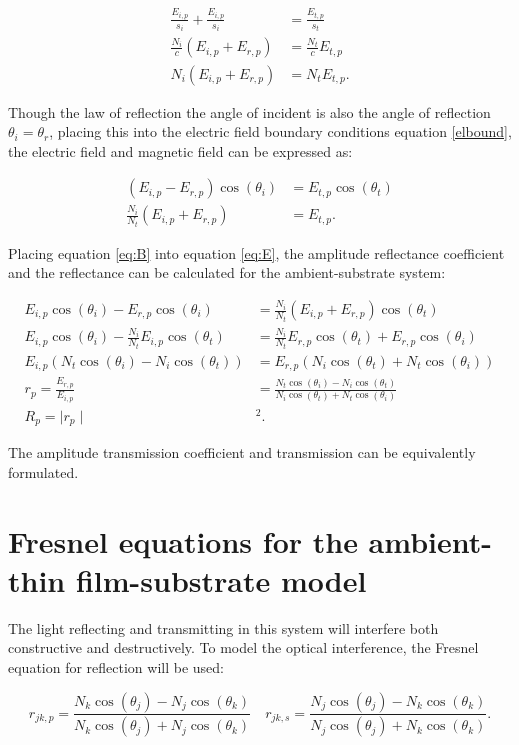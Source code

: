 \documentclass[MasterThesisMain.tex]{subfiles}
\begin{document}
\begin{align}
\frac{E_{i,p}}{s_i} + \frac{E_{i,p}}{s_i} &= \frac{E_{t,p}}{s_t}\\
\frac{N_i}{c}(E_{i,p}+E_{r,p}) &= \frac{N_t}{c}E_{t,p}\\
N_i(E_{i,p}+E_{r,p}) &= N_tE_{t,p}.
\end{align} 

Though the law of reflection the angle of incident is also the angle of reflection $\theta_i=\theta_r$, placing this into the electric field boundary conditions equation \ref{elbound}, the electric field and magnetic field can be expressed as:

\begin{align}
(E_{i,p}-E_{r,p})\cos(\theta_i) &= E_{t,p}\cos(\theta_t) \label{eq:E}\\
\frac{N_i}{N_t}(E_{i,p}+E_{r,p}) &= E_{t,p}. \label{eq:B}
\end{align}

Placing equation \ref{eq:B} into equation \ref{eq:E}, the amplitude reflectance coefficient and the reflectance can be calculated for the ambient-substrate system:

\begin{align}
E_{i,p}\cos(\theta_i)-E_{r,p}\cos(\theta_i) &= \frac{N_i}{N_t}(E_{i,p}+E_{r,p}) \cos(\theta_t) \\
E_{i,p}\cos(\theta_i) - \frac{N_i}{N_t}E_{i,p} \cos(\theta_t) &= \frac{N_i}{N_t}E_{r,p} \cos(\theta_t) + E_{r,p} \cos(\theta_i)\\
E_{i,p}(N_t\cos(\theta_i)-N_i\cos(\theta_t)) &= E_{r,p}(N_i\cos(\theta_t)+N_t\cos(\theta_i))\\
r_p = \frac{E_{r,p}}{E_{i,p}} &= \frac{N_t\cos(\theta_i)-N_i\cos(\theta_t)}{N_i\cos(\theta_t)+N_t\cos(\theta_i)} \label{eq:a-srefl}\\
R_p = \mid r_p \mid &^2.
\end{align}

The amplitude transmission coefficient and transmission can be equivalently formulated. 

\section{Fresnel equations for the ambient-thin film-substrate model}\label{ch:fresnel2lay}
The light reflecting and transmitting in this system will interfere both constructive and destructively. To model the optical interference, the Fresnel equation for reflection will be used:

\begin{equation}
r_{jk,p} = \frac{N_k\cos(\theta_j)-N_j\cos(\theta_k)}{N_k\cos(\theta_j)+N_j\cos(\theta_k)} \quad r_{jk,s} = \frac{N_j\cos(\theta_j)-N_k\cos(\theta_k)}{N_j\cos(\theta_j)+N_k\cos(\theta_k)}.
\end{equation}
\end{document}

